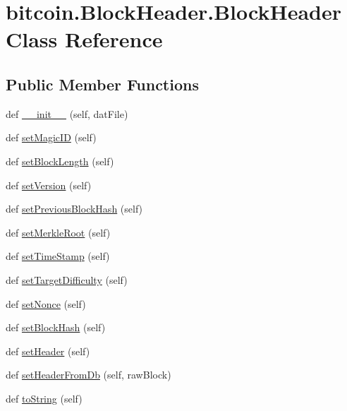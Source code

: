\hypertarget{classbitcoin_1_1BlockHeader_1_1BlockHeader}{}\section{bitcoin.\+Block\+Header.\+Block\+Header Class Reference}
\label{classbitcoin_1_1BlockHeader_1_1BlockHeader}
\subsection*{Public Member Functions}
\begin{DoxyCompactItemize}
\item 
def \hyperlink{classbitcoin_1_1BlockHeader_1_1BlockHeader_a67451aa3338158a8210f5313b2c50a49}{\+\_\+\+\_\+init\+\_\+\+\_\+} (self, dat\+File)
\item 
def \hyperlink{classbitcoin_1_1BlockHeader_1_1BlockHeader_ab77742cc580ba0ab33673102dfdd10e6}{set\+Magic\+I\+D} (self)
\item 
def \hyperlink{classbitcoin_1_1BlockHeader_1_1BlockHeader_a3e46ae8852d1c2b75acbf67e1f8d3d10}{set\+Block\+Length} (self)
\item 
def \hyperlink{classbitcoin_1_1BlockHeader_1_1BlockHeader_a42bae8e35ed1e9652f965cfe3f13612c}{set\+Version} (self)
\item 
def \hyperlink{classbitcoin_1_1BlockHeader_1_1BlockHeader_a44a883c665882fd715c8c620754083a0}{set\+Previous\+Block\+Hash} (self)
\item 
def \hyperlink{classbitcoin_1_1BlockHeader_1_1BlockHeader_a23b77127472458e02b7a2e171e397bd5}{set\+Merkle\+Root} (self)
\item 
def \hyperlink{classbitcoin_1_1BlockHeader_1_1BlockHeader_a27d7fd1ff75b0c3056abb1b071a360a3}{set\+Time\+Stamp} (self)
\item 
def \hyperlink{classbitcoin_1_1BlockHeader_1_1BlockHeader_a9d2e016e83b9bba1289587cfd1d13805}{set\+Target\+Difficulty} (self)
\item 
def \hyperlink{classbitcoin_1_1BlockHeader_1_1BlockHeader_a6e80688a2cdd9f0c30214364a22d62b4}{set\+Nonce} (self)
\item 
def \hyperlink{classbitcoin_1_1BlockHeader_1_1BlockHeader_aa9b505977b76d319e1f9e2303b8def75}{set\+Block\+Hash} (self)
\item 
def \hyperlink{classbitcoin_1_1BlockHeader_1_1BlockHeader_a86f14e6b4dbfb046938be0c13ec56ba0}{set\+Header} (self)
\item 
def \hyperlink{classbitcoin_1_1BlockHeader_1_1BlockHeader_afaef4f5b5aa2b09d2e2459834513570d}{set\+Header\+From\+Db} (self, raw\+Block)
\item 
def \hyperlink{classbitcoin_1_1BlockHeader_1_1BlockHeader_adec8c0a589ee1bbf2cc420b29d7955c1}{to\+String} (self)
\end{DoxyCompactItemize}
